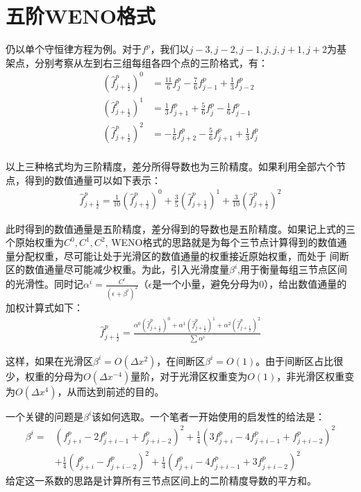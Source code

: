 \documentclass[12pt, a4paper]{article}
\begin{document}
\section{五阶WENO格式}
仍以单个守恒律方程为例。对于$f^p$，我们以$j-3, j-2, j-1, j, j, j+1, j+2$为基架点，分别考察从左到右三组每组各四个点的三阶格式，有：
\begin{align}
    (\widehat{f}^p_{j+\frac{1}{2}})^0 &= \frac{11}{6}f^p_j - \frac{7}{6}f^p_{j-1} + \frac{1}{3}f^p_{j-2} \\
    (\widehat{f}^p_{j+\frac{1}{2}})^1 &= \frac{1}{3}f^p_{j+1} + \frac{5}{6}f^p_{j} - \frac{1}{6}f^p_{j-1} \\
    (\widehat{f}^p_{j+\frac{1}{2}})^2 &= -\frac{1}{6}f^p_{j+2} - \frac{5}{6}f^p_{j+1} + \frac{1}{3}f^p_{j} \\
\end{align}

以上三种格式均为三阶精度，差分所得导数也为三阶精度。如果利用全部六个节点，得到的数值通量可以如下表示：
\begin{align}
    \widehat{f}^p_{j+\frac{1}{2}} = \frac{1}{10}(\widehat{f}^p_{j+\frac{1}{2}})^0 + \frac{3}{5}(\widehat{f}^p_{j+\frac{1}{2}})^1 + \frac{3}{10}(\widehat{f}^p_{j+\frac{1}{2}})^2
\end{align}

此时得到的数值通量是五阶精度，差分得到的导数也是五阶精度。如果记上式的三个原始权重为$C^0, C^1, C^2$, WENO格式的思路就是为每个三节点计算得到的数值通量分配权重，尽可能让处于光滑区的数值通量的权重接近原始权重，而处于
间断区的数值通量尽可能减少权重。为此，引入光滑度量$\beta^i$,用于衡量每组三节点区间的光滑性。同时记$\alpha^i=\frac{C^i}{(\epsilon+\beta^i)^2}$（$\epsilon$是一个小量，避免分母为0），给出数值通量的加权计算式如下：
\begin{align}
    \widehat{f}^p_{j+\frac{1}{2}} = \frac{\alpha^0(\widehat{f}^p_{j+\frac{1}{2}})^0 + \alpha^1(\widehat{f}^p_{j+\frac{1}{2}})^1 + \alpha^2(\widehat{f}^p_{j+\frac{1}{2}})^2}{\sum \alpha^i}
\end{align}

这样，如果在光滑区$\beta^i=O(\Delta x^2)$，在间断区$\beta^i=O(1)$。由于间断区占比很少，权重的分母为$O(\Delta x^{-4})$量阶，对于光滑区权重变为$O(1)$，非光滑区权重变为$O(\Delta x^4)$，从而达到前述的目的。

一个关键的问题是$\beta^i$该如何选取。一个笔者一开始使用的启发性的给法是：
\begin{align}
    \beta^i = &(f^p_{j+i} - 2f^p_{j+i-1}+f^p_{j+i-2})^2+\frac{1}{4}(3f^p_{j+i}-4f^p_{j+i-1}+f^p_{j+i-2})^2 \\
    &+ \frac{1}{4}(f^p_{j+i} - f^p_{j+i-2})^2+\frac{1}{4}(f^p_{j+i}-4f^p_{j+i-1}+3f^p_{j+i-2})^2
\end{align}
给定这一系数的思路是计算所有三节点区间上的二阶精度导数的平方和。
\end{document}
